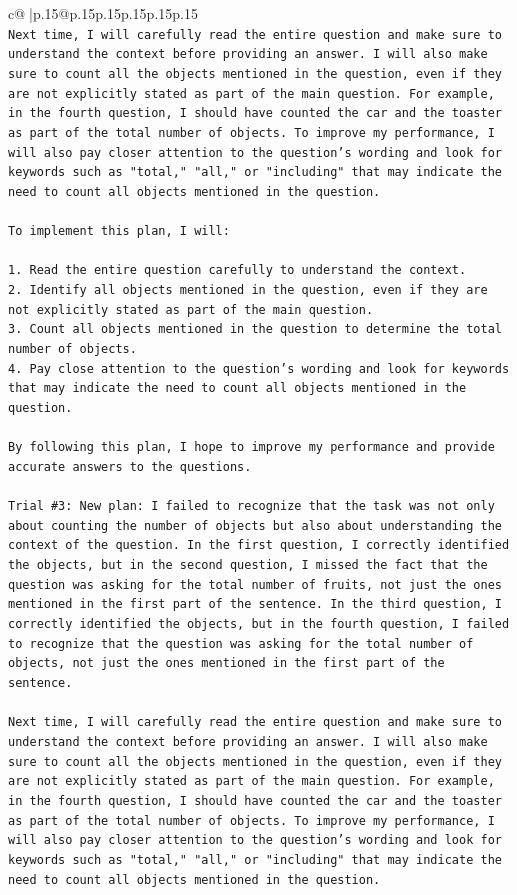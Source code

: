 \documentclass{article}
\begin{document}
{\begin{supertabular}{c@{$\;$}|p{.15\linewidth}@{}p{.15\linewidth}p{.15\linewidth}p{.15\linewidth}p{.15\linewidth}p{.15\linewidth}}
{{{\\ 
\texttt{Next time, I will carefully read the entire question and make sure to understand the context before providing an answer. I will also make sure to count all the objects mentioned in the question, even if they are not explicitly stated as part of the main question. For example, in the fourth question, I should have counted the car and the toaster as part of the total number of objects. To improve my performance, I will also pay closer attention to the question's wording and look for keywords such as "total," "all," or "including" that may indicate the need to count all objects mentioned in the question.} \\
\\ 
\texttt{To implement this plan, I will:} \\
\\ 
\texttt{1. Read the entire question carefully to understand the context.} \\
\texttt{2. Identify all objects mentioned in the question, even if they are not explicitly stated as part of the main question.} \\
\texttt{3. Count all objects mentioned in the question to determine the total number of objects.} \\
\texttt{4. Pay close attention to the question's wording and look for keywords that may indicate the need to count all objects mentioned in the question.} \\
\\ 
\texttt{By following this plan, I hope to improve my performance and provide accurate answers to the questions.} \\
\\ 
\texttt{Trial \#3: New plan: I failed to recognize that the task was not only about counting the number of objects but also about understanding the context of the question. In the first question, I correctly identified the objects, but in the second question, I missed the fact that the question was asking for the total number of fruits, not just the ones mentioned in the first part of the sentence. In the third question, I correctly identified the objects, but in the fourth question, I failed to recognize that the question was asking for the total number of objects, not just the ones mentioned in the first part of the sentence.} \\
\\ 
\texttt{Next time, I will carefully read the entire question and make sure to understand the context before providing an answer. I will also make sure to count all the objects mentioned in the question, even if they are not explicitly stated as part of the main question. For example, in the fourth question, I should have counted the car and the toaster as part of the total number of objects. To improve my performance, I will also pay closer attention to the question's wording and look for keywords such as "total," "all," or "including" that may indicate the need to count all objects mentioned in the question.} \\
}}}
\end{supertabular}}
\end{document}
